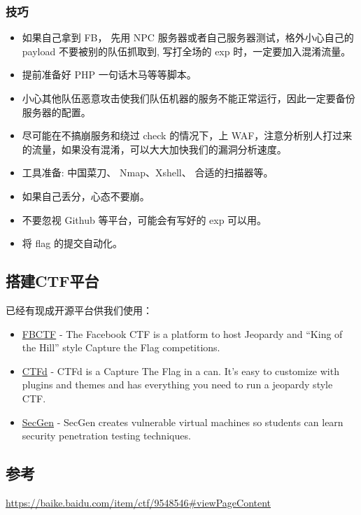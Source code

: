 \subsubsection{技巧}
\begin{itemize}
    \item 如果自己拿到 FB， 先用 NPC 服务器或者自己服务器测试，格外小心自己的 payload 不要被别的队伍抓取到, 写打全场的 exp 时，一定要加入混淆流量。
    \item 提前准备好 PHP 一句话木马等等脚本。
    \item 小心其他队伍恶意攻击使我们队伍机器的服务不能正常运行，因此一定要备份服务器的配置。
    \item 尽可能在不搞崩服务和绕过 check 的情况下，上 WAF，注意分析别人打过来的流量，如果没有混淆，可以大大加快我们的漏洞分析速度。
    \item 工具准备: 中国菜刀、 Nmap、Xshell、 合适的扫描器等。
    \item 如果自己丢分，心态不要崩。
    \item 不要忽视 Github 等平台，可能会有写好的 exp 可以用。
    \item 将 flag 的提交自动化。
\end{itemize}



\subsection{搭建CTF平台}
\indent \setlength{\parindent}{2em}
\indent 已经有现成开源平台供我们使用：
\indent \begin{itemize}
    \item \href{https://github.com/facebook/fbctf}{FBCTF} - The Facebook CTF is a platform to host Jeopardy and “King of the Hill” style Capture the Flag competitions.
    
    \item \href{https://github.com/CTFd/CTFd}{CTFd} - CTFd is a Capture The Flag in a can. It's easy to customize with plugins and themes and has everything you need to run a jeopardy style CTF.
    
    \item \href{https://github.com/cliffe/SecGen}{SecGen} - SecGen creates vulnerable virtual machines so students can learn security penetration testing techniques.
\end{itemize}

\subsection{参考}
\indent \setlength{\parindent}{2em}

\indent \href{https://baike.baidu.com/item/ctf/9548546#viewPageContent}{https://baike.baidu.com/item/ctf/9548546#viewPageContent}
